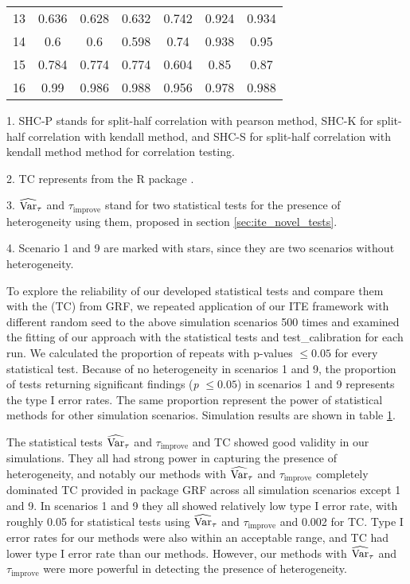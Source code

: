 \begin{table}[htbp]
\begin{threeparttable}
\begin{tabular}{c|cccccc}
          13    & 0.636 & 0.628 & 0.632 & 0.742 & 0.924 & 0.934 \\
          14    & 0.6   & 0.6   & 0.598 & 0.74  & 0.938 & 0.95 \\
          15    & 0.784 & 0.774 & 0.774 & 0.604 & 0.85  & 0.87 \\
          16    & 0.99  & 0.986 & 0.988 & 0.956 & 0.978 & 0.988 \\
          \bottomrule
          \end{tabular}%
          \begin{tablenotes}
            \small
            \item 1. SHC-P stands for split-half correlation with pearson method, SHC-K for split-half correlation with kendall method, and SHC-S for split-half correlation with kendall method method for correlation testing.
            \item 2. TC represents  from the R package .
            \item 3. $\operatorname{\widehat{Var}}_{\tau}$ and $\tau_{\mathrm{improve}}$ stand for two statistical tests for the presence of heterogeneity using them, proposed in section \ref{sec:ite_novel_tests}.
            \item 4. Scenario 1 and 9 are marked with stars, since they are two scenarios without heterogeneity.
          \end{tablenotes}
      \end{threeparttable}
    \label{Tab:ite_sim_res}%
    \end{table}%

    To explore the reliability of our developed statistical tests and compare them with the  (TC) from GRF, we repeated application of our ITE framework with different random seed to the above simulation scenarios 500 times and examined the fitting of our approach with the statistical tests and test\_calibration for each run. We calculated the proportion of repeats with p-values $\leq 0.05$ for every statistical test. Because of no heterogeneity in scenarios 1 and 9, the proportion of tests returning significant findings (\textit{p} $\leq 0.05$)  in scenarios 1 and 9 represents the type I error rates. The same proportion represent the power of statistical methods for other simulation scenarios. Simulation results are shown in table \ref{Tab:ite_sim_res}.

    The statistical tests $\operatorname{\widehat{Var}}_{\tau}$ and $\tau_{\mathrm{improve}}$ and TC showed good validity in our simulations. They all had strong power in capturing the presence of heterogeneity, and notably our methods with $\operatorname{\widehat{Var}}_{\tau}$ and $\tau_{\mathrm{improve}}$ completely dominated TC provided in package GRF across all simulation scenarios except 1 and 9. In scenarios 1 and 9 they all showed relatively low type I error rate, with roughly 0.05 for statistical tests using $\operatorname{\widehat{Var}}_{\tau}$ and $\tau_{\mathrm{improve}}$ and 0.002 for TC. Type I error rates for our methods were also within an acceptable range, and TC had lower type I error rate than our methods. However, our methods with $\operatorname{\widehat{Var}}_{\tau}$ and $\tau_{\mathrm{improve}}$ were more powerful in detecting the presence of heterogeneity.

